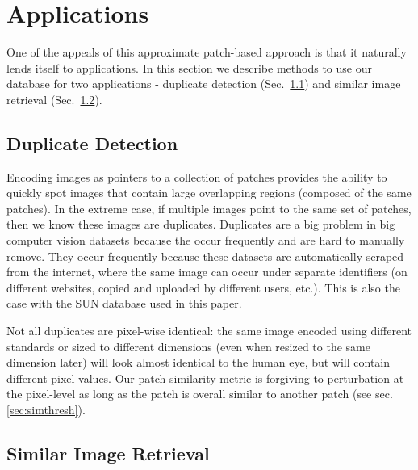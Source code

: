 \section{Applications}\label{sec:apps}

One of the appeals of this approximate patch-based approach
is that it naturally lends itself to applications. In this
section we describe methods to use our database for
two applications - duplicate detection (Sec.~\ref{ssec:dups})
and similar image retrieval (Sec.~\ref{ssec:retr}).

\subsection{Duplicate Detection}\label{ssec:dups}

Encoding images as pointers to a collection of patches provides the ability to quickly spot images that contain large overlapping regions (composed of the same patches). In the extreme case, if multiple images point to the same set of patches, then we know these images are duplicates. Duplicates are a big problem in big computer vision datasets because the occur frequently and are hard to manually remove. They occur frequently because these datasets are automatically scraped from the internet, where the same image can occur under separate identifiers (on different websites, copied and uploaded by different users, etc.). This is also the case with the SUN database \cite{SUN} used in this paper.

Not all duplicates are pixel-wise identical: the same image encoded using different standards or sized to different dimensions (even when resized to the same dimension later) will look almost identical to the human eye, but will contain different pixel values. Our patch similarity metric is forgiving to perturbation at the pixel-level as long as the patch is overall similar to another patch (see sec.\ref{sec:simthresh}).

\subsection{Similar Image Retrieval}\label{ssec:retr}
